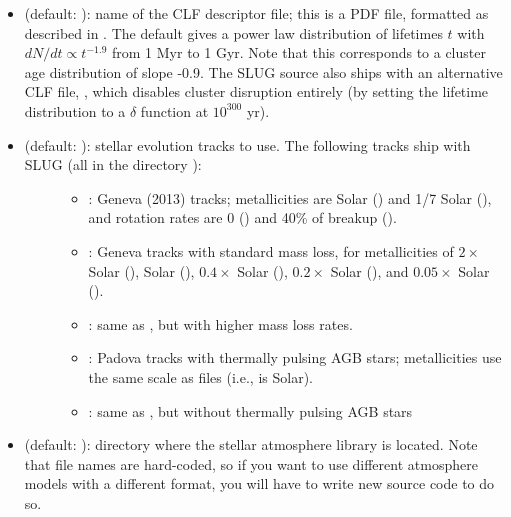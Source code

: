 \documentclass[letterpaper,10pt,english]{sphinxmanual}
\begin{document}
\begin{itemize}
\item {} 
 (default: ): name of the CLF descriptor file; this is a PDF file, formatted as described in {\hyperref[pdfs:sec-pdfs]{\emph{}}}. The default gives a power law distribution of lifetimes \(t\) with \(dN/dt\propto t^{-1.9}\) from 1 Myr to 1 Gyr. Note that this corresponds to a cluster age distribution of slope -0.9. The SLUG source also ships with an alternative CLF file, , which disables cluster disruption entirely (by setting the lifetime distribution to a \(\delta\) function at \(10^{300}\) yr).

\item {} \begin{description}
\item[{ (default: ): stellar evolution tracks to use. The following tracks ship with SLUG (all in the directory ):}] \leavevmode\begin{itemize}
\item {} 
: Geneva (2013) tracks; metallicities are Solar () and 1/7 Solar (), and rotation rates are 0 () and 40\% of breakup ().

\item {} 
: Geneva tracks with standard mass loss, for metallicities of \(2\times\) Solar (), Solar (), \(0.4\times\) Solar (), \(0.2\times\) Solar (), and \(0.05\times\) Solar ().

\item {} 
: same as , but with higher mass loss rates.

\item {} 
: Padova tracks with thermally pulsing AGB stars; metallicities use the same scale as  files (i.e.,  is Solar).

\item {} 
: same as , but without thermally pulsing AGB stars

\end{itemize}

\end{description}

\item {} 
 (default: ): directory where the stellar atmosphere library is located. Note that file names are hard-coded, so if you want to use different atmosphere models with a different format, you will have to write new source code to do so.


\end{itemize}
\end{document}

